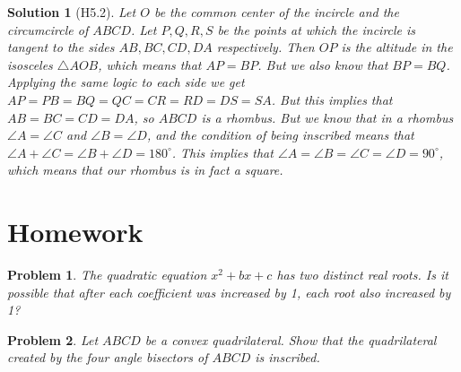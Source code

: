 \documentclass[a4paper,12pt]{article}
\theoremstyle{perfect}
\newtheorem{sol}{Solution}
\newtheorem{prb}{Problem}
\begin{document}
\begin{sol}[H5.2]
Let $O$ be the common center of the incircle and the circumcircle of $ABCD$. Let $P, Q, R, S$ be the points at which the incircle is tangent to the sides $AB, BC, CD, DA$ respectively. Then $OP$ is the altitude in the isosceles $\triangle AOB$, which means that $AP = BP$. But we also know that $BP = BQ$. Applying the same logic to each side we get $AP = PB = BQ = QC = CR = RD = DS = SA$. But this implies that $AB = BC = CD = DA$, so $ABCD$ is a rhombus. But we know that in a rhombus $\angle A = \angle C$ and $\angle B = \angle D$, and the condition of being inscribed means that $\angle A + \angle C = \angle B + \angle D = 180^\circ$. This implies that $\angle A = \angle B = \angle C = \angle D = 90^\circ$, which means that our rhombus is in fact a square.
 \end{sol}

\section{Homework}

\begin{prb}
The quadratic equation $x^2+bx+c$ has two distinct real roots. Is it possible that after each coefficient was increased by 1, each root also increased by 1?
\end{prb}

\begin{prb}
Let $ABCD$ be a convex quadrilateral. Show that the quadrilateral created by the four angle bisectors of $ABCD$ is inscribed.
\end{prb}
\end{document}
